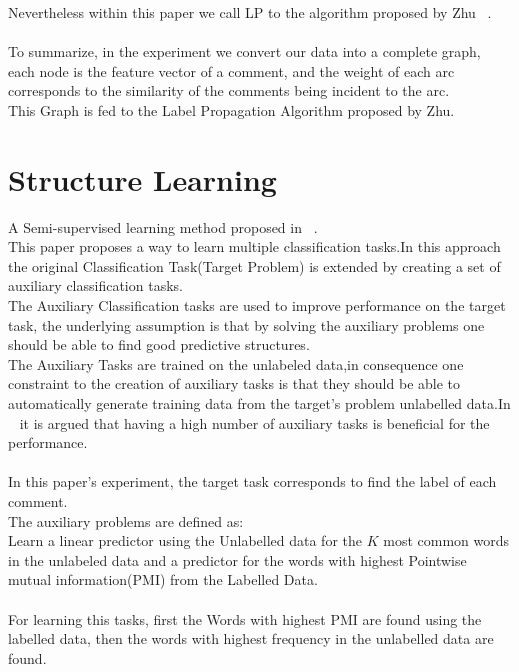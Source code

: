 \documentclass[4pt,a4paper,twocolumn]{article}
\begin{document}
Nevertheless within this paper we call LP to the algorithm proposed by Zhu ~\cite{Zhu:2005:SLG:1104523}.\\
\\
To summarize, in the experiment we convert our data into a complete graph,
each node is the feature vector of a comment, and the weight of each arc
corresponds to the similarity of the comments being incident to the arc.\\
This Graph is  fed to the Label Propagation Algorithm proposed by Zhu.\\



 
\section{Structure Learning}
A Semi-supervised learning method proposed in ~\cite{Ando:2005:FLP:1046920.1194905}.\\
This paper proposes a way to learn multiple classification tasks.In this approach the original Classification Task(Target Problem) is extended by creating a set of auxiliary classification tasks.\\
The Auxiliary Classification tasks are used to improve performance on the target task,
the underlying assumption is that by solving the auxiliary problems one should be able to find good predictive structures.\\
The Auxiliary Tasks are trained on the unlabeled data,in consequence one constraint to the creation of auxiliary tasks is that they should be able to automatically generate training data from the target's problem unlabelled data.In ~\cite{Ando:2005:HSL:1219840.1219841} it is argued that having a high number of auxiliary tasks is beneficial for the performance.\\
\\
In this paper's experiment, the target task corresponds to find the label of each comment.\\
The auxiliary problems are defined as:\\
Learn a linear predictor using the Unlabelled data for the $K$ most common words in the unlabeled data and a predictor for the words with highest Pointwise mutual information(PMI) from the Labelled Data.\\
\\
For learning this tasks, first the Words with highest PMI are found using the labelled data, then the words with highest frequency in the unlabelled data are found.\\
\end{document}
